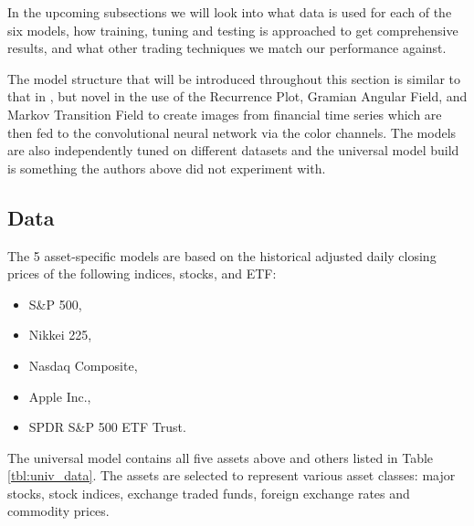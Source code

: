 \documentclass[12pt, a4paper]{article}
\begin{document}
In the upcoming subsections we will look into what data is used for each of the six models, how training, tuning and testing is approached to get comprehensive results, and what other trading techniques we match our performance against.

The model structure that will be introduced throughout this section is similar to that in \cite{sezer2018algorithmic}, but novel in the use of the Recurrence Plot, Gramian Angular Field, and Markov Transition Field to create images from financial time series which are then fed to the convolutional neural network via the color channels. The models are also independently tuned on different datasets and the universal model build is something the authors above did not experiment with. 

\label{sec:DM}
\subsection{Data}
\label{subsec:DM:Data}

The 5 asset-specific models are based on the historical adjusted daily closing prices of the following indices, stocks, and ETF:

\begin{itemize}
    \item S\&P 500,
    \item Nikkei 225,
    \item Nasdaq Composite,
    \item Apple Inc.,
    \item SPDR S\&P 500 ETF Trust.
\end{itemize} 

The universal model contains all five assets above and others listed in Table \ref{tbl:univ_data}. The assets are selected to represent various asset classes: major stocks, stock indices, exchange traded funds, foreign exchange rates and commodity prices.
\end{document}

